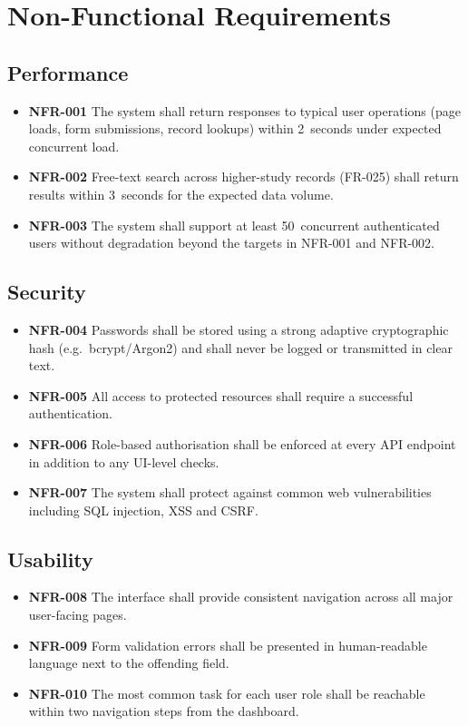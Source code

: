 \documentclass[11pt,a4paper]{article}
\begin{document}
\section{Non-Functional Requirements}

\subsection{Performance}
\begin{itemize}
  \item \textbf{NFR-001} The system shall return responses to typical user operations (page loads, form submissions, record lookups) within 2~seconds under expected concurrent load.
  \item \textbf{NFR-002} Free-text search across higher-study records (FR-025) shall return results within 3~seconds for the expected data volume.
  \item \textbf{NFR-003} The system shall support at least 50~concurrent authenticated users without degradation beyond the targets in NFR-001 and NFR-002.
\end{itemize}

\subsection{Security}
\begin{itemize}
  \item \textbf{NFR-004} Passwords shall be stored using a strong adaptive cryptographic hash (e.g.\ bcrypt/Argon2) and shall never be logged or transmitted in clear text.
  \item \textbf{NFR-005} All access to protected resources shall require a successful authentication.
  \item \textbf{NFR-006} Role-based authorisation shall be enforced at every API endpoint in addition to any UI-level checks.
  \item \textbf{NFR-007} The system shall protect against common web vulnerabilities including SQL injection, XSS and CSRF.
\end{itemize}

\subsection{Usability}
\begin{itemize}
  \item \textbf{NFR-008} The interface shall provide consistent navigation across all major user-facing pages.
  \item \textbf{NFR-009} Form validation errors shall be presented in human-readable language next to the offending field.
  \item \textbf{NFR-010} The most common task for each user role shall be reachable within two navigation steps from the dashboard.
\end{itemize}
\end{document}
